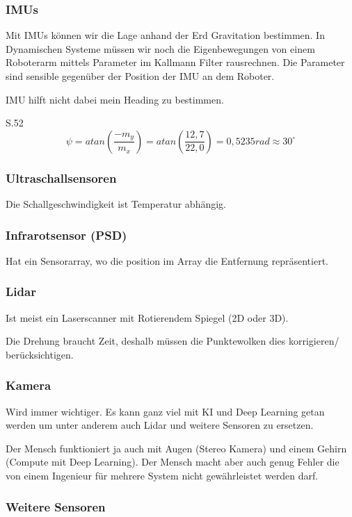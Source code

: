 \documentclass[a4paper]{article}
\begin{document}
\subsubsection{IMUs}

Mit IMUs können wir die Lage anhand der Erd Gravitation bestimmen. In Dynamischen Systeme müssen wir noch die Eigenbewegungen von einem Roboterarm mittels Parameter im Kallmann Filter rausrechnen. Die Parameter sind sensible gegenüber der Position der IMU an dem Roboter.

IMU hilft nicht dabei mein Heading zu bestimmen.

S.52 $$\psi = atan(\frac{-m_y}{m_x}) = atan(\frac{12,7}{22,0}) = 0,5235 rad \approx 30^\circ$$

\subsubsection{Ultraschallsensoren}

Die Schallgeschwindigkeit ist Temperatur abhängig.

\subsubsection{Infrarotsensor (PSD)}

Hat ein Sensorarray, wo die position im Array die Entfernung repräsentiert.

\subsubsection{Lidar}

Ist meist ein Laserscanner mit Rotierendem Spiegel (2D oder 3D).

Die Drehung braucht Zeit, deshalb müssen die Punktewolken dies korrigieren/ berücksichtigen.

\subsubsection{Kamera}

Wird immer wichtiger. Es kann ganz viel mit KI und Deep Learning getan werden um unter anderem auch Lidar und weitere Sensoren zu ersetzen.

Der Mensch funktioniert ja auch mit Augen (Stereo Kamera) und einem Gehirn (Compute mit Deep Learning). Der Mensch macht aber auch genug Fehler die von einem Ingenieur für mehrere System nicht gewährleistet werden darf.

\subsubsection{Weitere Sensoren}
\end{document}
